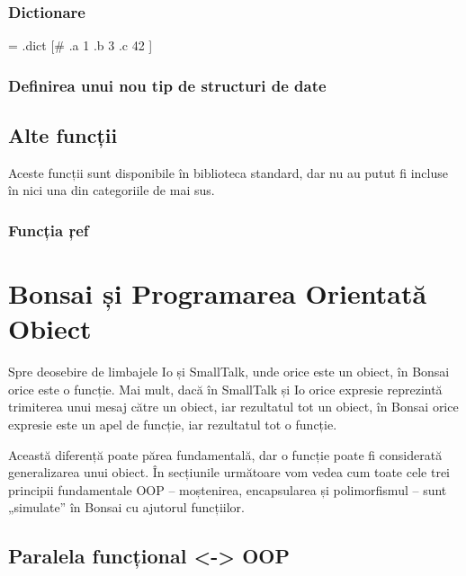 \documentclass[12pt,a4paper]{memoir}
\begin{document}
\begin{itemize}
\subsection{Dictionare}

\begin{code}
= .dict [# 
  .a 1 
  .b 3
  .c 42 
]
\end{code}

\subsection{Definirea unui nou tip de structuri de date}


\section{Alte funcții}

Aceste funcții sunt disponibile în biblioteca standard, dar nu au putut fi incluse în nici una din categoriile de mai sus.

\subsection{Funcția \c{ref}}


\chapter{Bonsai și Programarea Orientată Obiect}

Spre deosebire de limbajele Io\cite{io} și SmallTalk\cite{smalltalk}, unde orice este un obiect, în Bonsai orice este o funcție. Mai mult, dacă în SmallTalk și Io orice expresie reprezintă trimiterea unui mesaj către un obiect, iar rezultatul tot un obiect, în Bonsai orice expresie este un apel de funcție, iar rezultatul tot o funcție.

Această diferență poate părea fundamentală, dar o funcție poate fi considerată generalizarea unui obiect. În secțiunile următoare vom vedea cum toate cele trei principii fundamentale OOP – moștenirea, encapsularea și polimorfismul – sunt „simulate” în Bonsai cu ajutorul funcțiilor.

\section{Paralela funcțional <-> OOP}


\end{itemize}
\end{document}
